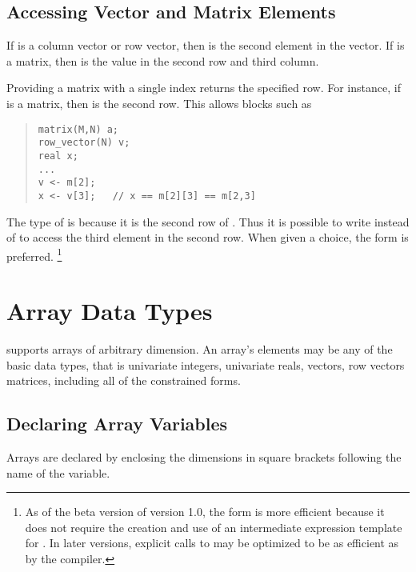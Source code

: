 \subsection{Accessing Vector and Matrix Elements}

If  is a column vector or row vector, then  is the
second element in the vector.  If  is a matrix, then
 is the value in the second row and third column.

Providing a matrix with a single index returns the specified row.  For
instance, if  is a matrix, then  is the second row.
This allows \Stan blocks such as
%
\begin{quote}
\begin{Verbatim} 
matrix(M,N) a;    
row_vector(N) v;    
real x;
...
v <- m[2];   
x <- v[3];   // x == m[2][3] == m[2,3]
\end{Verbatim}
\end{quote}
% 
The type of  is  because it is the second
row of .  Thus it is possible to write  instead
of  to access the third element in the second row.  When
given a choice, the form  is preferred.%
%
\footnote{As of the beta version of \Stan version 1.0, the form
   is more efficient because it does not require the
  creation and use of an intermediate expression template for
  .  In later versions, explicit calls to 
  may be optimized to be as efficient as  by the \Stan
  compiler.}


\section{Array Data Types}

\Stan supports arrays of arbitrary dimension.  An array's elements may
be any of the basic data types, that is univariate integers,
univariate reals, vectors, row vectors matrices, including all of the
constrained forms.

\subsection{Declaring Array Variables}

Arrays are declared by enclosing the dimensions in square brackets
following the name of the variable.

